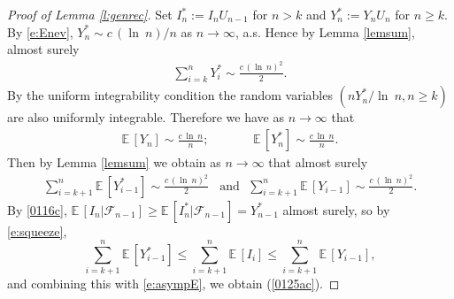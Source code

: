 \documentclass[12pt]{article}
\newcommand{\cF}{\mathcal{F}}
\newcommand{\E}{\mathbb E \,}
\renewcommand{\log}{{\ln \:}}
\begin{document}
\begin{proof}[Proof of Lemma \ref{l:genrec}]
	Set $I_n^* := I_n U_{n-1}$ for $n > k $
	and $Y^*_n := Y_n U_n$ for $n \geq k$.
	By \eqref{e:Enev},  $Y_n^* \sim c \, (\log n)/n$ as $n \to \infty$, a.s.
Hence  by Lemma \ref{lemsum},
 almost surely
	\begin{align}
\sum_{i=k}^n Y_i^* \sim \frac{ c \, (\log n)^2 }{2}.
\label{0116b}
	\end{align} 
By the uniform integrability condition the
 random variables
	$(nY_n^*/\log n, n \geq k)$
are  also uniformly integrable.
	Therefore we have as $n \to \infty$ that
		\begin{align}
	\E[Y_n] \sim \frac{c \, \log n}{n};
			~~~~ ~~~~ ~~~~
			 ~~~~
	\E[Y_n^*] \sim \frac{c \, \log n}{n}.
\label{0308b}
		\end{align}
%
 Then by  Lemma \ref{lemsum} we obtain
	as $n \to \infty$
 that  almost surely 
 \begin{align}
	 \sum_{i = k+1}^n \E[Y^*_{i-1}] \sim \frac{c \, (\log n)^2}{2} 
	 ~~~~ \mbox{and} ~~~
	 \sum_{i = k+1}^n \E[Y_{i-1}] \sim \frac{c \, (\log n)^2}{2}.
	 \label{e:asympE}
 \end{align}
	By
	\eqref{0116c}, $\E[I_n |\cF_{n-1} ] \geq \E[I^*_n|\cF_{n-1}]
	= Y^*_{n-1}$ almost surely, so
 by \eqref{e:squeeze},
 $$
 \sum_{i = k+1}^n \E [ Y_{i-1}^*] \leq \sum_{i = k+1}^n \E[I_i]
 \leq \sum_{i = k+1}^n \E [ Y_{i-1}], 
 $$
 and combining this with \eqref{e:asympE},
 we obtain (\ref{0125ac}).
 


\end{proof}
\end{document}

